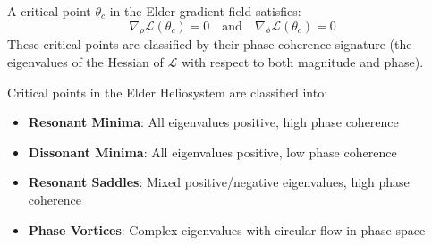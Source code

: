 \begin{definition}
A critical point $\theta_c$ in the Elder gradient field satisfies:
\begin{equation}
\nabla_{\rho}\mathcal{L}(\theta_c) = 0 \quad \text{and} \quad \nabla_{\phi}\mathcal{L}(\theta_c) = 0
\end{equation}
These critical points are classified by their phase coherence signature (the eigenvalues of the Hessian of $\mathcal{L}$ with respect to both magnitude and phase).
\end{definition}

\begin{theorem}
Critical points in the Elder Heliosystem are classified into:
\begin{itemize}
    \item \textbf{Resonant Minima}: All eigenvalues positive, high phase coherence
    \item \textbf{Dissonant Minima}: All eigenvalues positive, low phase coherence
    \item \textbf{Resonant Saddles}: Mixed positive/negative eigenvalues, high phase coherence
    \item \textbf{Phase Vortices}: Complex eigenvalues with circular flow in phase space
\end{itemize}
\end{theorem}

